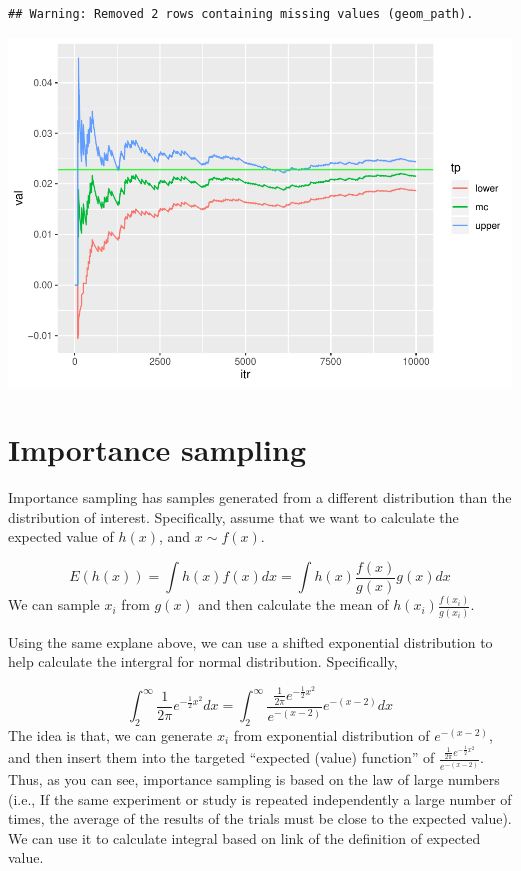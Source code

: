 \documentclass[]{book}
\begin{document}
\begin{verbatim}
## Warning: Removed 2 rows containing missing values (geom_path).
\end{verbatim}

\includegraphics{bookdown-demo_files/figure-latex/unnamed-chunk-21-1.pdf}

\section{Importance sampling}\label{importance-sampling}

Importance sampling has samples generated from a different distribution
than the distribution of interest. Specifically, assume that we want to
calculate the expected value of \(h(x)\), and \(x \sim f(x)\).

\[E(h(x))=\int h(x) f(x) dx = \int h(x) \frac{f(x)}{g(x)} g(x) dx \] We
can sample \(x_i\) from \(g(x)\) and then calculate the mean of
\(h(x_i) \frac{f(x_i)}{g(x_i)}\).

Using the same explane above, we can use a shifted exponential
distribution to help calculate the intergral for normal distribution.
Specifically,

\[\int_2^{\infty} \frac{1}{2 \pi} e^{-\frac{1}{2}x^2}dx = \int_2^{\infty} \frac{\frac{1}{2 \pi} e^{-\frac{1}{2}x^2}}{e^{-(x-2)}} e^{-(x-2)}dx \]
The idea is that, we can generate \(x_i\) from exponential distribution
of \(e^{-(x-2)}\), and then insert them into the targeted ``expected
(value) function'' of
\(\frac{\frac{1}{2 \pi} e^{-\frac{1}{2}x^2}}{e^{-(x-2)}}\). Thus, as you
can see, importance sampling is based on the law of large numbers (i.e.,
If the same experiment or study is repeated independently a large number
of times, the average of the results of the trials must be close to the
expected value). We can use it to calculate integral based on link of
the definition of expected value.
\end{document}
